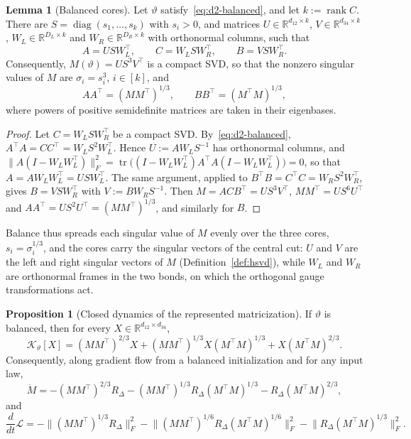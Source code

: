 \documentclass[11pt]{article}
\newcommand{\diag}{\operatorname{diag}}
\newcommand{\rank}{\operatorname{rank}}
\newcommand{\R}{\mathbb{R}}
\newcommand{\norm}[1]{\lVert #1\rVert}
\theoremstyle{definition}
\newtheorem{proposition}[theorem]{Proposition}
\newtheorem{lemma}[theorem]{Lemma}
\numberwithin{equation}{section}
\begin{document}
\begin{lemma}[Balanced cores]\label{lem:d2-balanced-factors}
Let $\vartheta$ satisfy~\eqref{eq:d2-balanced}, and let $k:=\rank C$. There are $S=\diag(s_1,\dots,s_k)$ with $s_i>0$, and matrices $U\in\R^{d_{12}\times k}$, $V\in\R^{d_{34}\times k}$, $W_L\in\R^{D_L\times k}$ and $W_R\in\R^{D_R\times k}$ with orthonormal columns, such that
\begin{equation}\label{eq:d2-balanced-factors}
A=USW_L^\top,\qquad C=W_LSW_R^\top,\qquad B=VSW_R^\top.
\end{equation}
Consequently, $M(\vartheta)=US^3V^\top$ is a compact SVD, so that the nonzero singular values of $M$ are $\sigma_i=s_i^3$, $i\in[k]$, and
\begin{equation}\label{eq:d2-balanced-grams}
AA^\top=(MM^\top)^{1/3},\qquad BB^\top=(M^\top M)^{1/3},
\end{equation}
where powers of positive semidefinite matrices are taken in their eigenbases.
\end{lemma}

\begin{proof}
Let $C=W_LSW_R^\top$ be a compact SVD. By~\eqref{eq:d2-balanced}, $A^\top A=CC^\top=W_LS^2W_L^\top$. Hence $U:=AW_LS^{-1}$ has orthonormal columns, and $\norm{A(I-W_LW_L^\top)}_F^2=\operatorname{tr}\big((I-W_LW_L^\top)A^\top A(I-W_LW_L^\top)\big)=0$, so that $A=AW_LW_L^\top=USW_L^\top$. The same argument, applied to $B^\top B=C^\top C=W_RS^2W_R^\top$, gives $B=VSW_R^\top$ with $V:=BW_RS^{-1}$. Then $M=ACB^\top=US^3V^\top$, $MM^\top=US^6U^\top$ and $AA^\top=US^2U^\top=(MM^\top)^{1/3}$, and similarly for $B$.
\end{proof}

Balance thus spreads each singular value of $M$ evenly over the three cores, $s_i=\sigma_i^{1/3}$, and the cores carry the singular vectors of the central cut: $U$ and $V$ are the left and right singular vectors of $M$ (Definition~\ref{def:hsvd}), while $W_L$ and $W_R$ are orthonormal frames in the two bonds, on which the orthogonal gauge transformations act.

\begin{proposition}[Closed dynamics of the represented matricization]\label{prop:d2-balanced-flow}
If $\vartheta$ is balanced, then for every $X\in\R^{d_{12}\times d_{34}}$,
\begin{equation}\label{eq:d2-balanced-K}
\mathcal K_\vartheta[X]=(MM^\top)^{2/3}X+(MM^\top)^{1/3}X(M^\top M)^{1/3}+X(M^\top M)^{2/3}.
\end{equation}
Consequently, along gradient flow from a balanced initialization and for any input law,
\begin{equation}\label{eq:d2-balanced-M-flow}
\dot M=-(MM^\top)^{2/3}R_\Delta-(MM^\top)^{1/3}R_\Delta(M^\top M)^{1/3}-R_\Delta(M^\top M)^{2/3},
\end{equation}
and
\begin{equation}\label{eq:d2-balanced-loss-decay}
\frac{d}{dt}\mathcal L=-\norm{(MM^\top)^{1/3}R_\Delta}_F^2-\norm{(MM^\top)^{1/6}R_\Delta(M^\top M)^{1/6}}_F^2-\norm{R_\Delta(M^\top M)^{1/3}}_F^2.
\end{equation}
\end{proposition}
\end{document}
